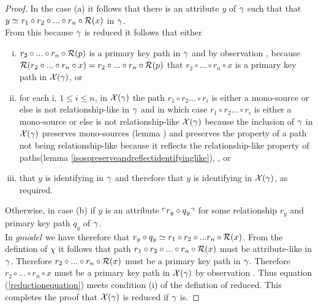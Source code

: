 \begin{proof}
In the case (a) it follows that there is an  attribute $y$ of $\gamma$ such that
that $y \simeq r_1 \circ r_2 \circ ... \circ r_n \circ \mathcal{R}(x)$ in $\gamma$. \\

From this because $\gamma$ is reduced it follows that either  
\begin{enumerate}[(i)]
\item $r_2 \circ ... \circ r_n \circ \mathcal{R}(p)$ is a primary key path in $\gamma$ and by observation , because $\mathcal{R}(r_2 \circ ... \circ r_n \circ x) = r_2 \circ ... \circ r_n \circ \mathcal{R}(p)$ that $r_2 \circ ... \circ r_n \circ x$ is a primary key path in $\mathcal{X}(\gamma)$, or 
\item for each i, $1 \leq i \leq n$, in $\mathcal{X}(\gamma)$ the path $r_1 \circ r_2 ... \circ r_i$ is either a mono-source or else is not relationship-like in $\gamma$
and in which case $r_1 \circ r_2 ... \circ r_i$ is either a mono-source or else is not relationship-like $\mathcal{X}(\gamma)$ because the inclusion of $\gamma$ in $\mathcal{X}(\gamma)$ 
preserves mono-sources (lemma ) and preserves the property of a path not being relationship-like because it reflects the relationship-like property of paths(lemma \ref{isospreserveandreflectidentifyinglike}), , or
\item that $y$ is identifying in $\gamma$ and therefore that $y$ is identifying in $\mathcal{X}(\gamma)$, as required.
\end{enumerate}

Otherwise, in case (b) if $y$ is an attribute $\left\ulcorner r_y \circ q_y\right\urcorner$ for some relationship $r_y$ and primary key path $q_y$ of $\gamma$. \\

In $gmodel$ we have therefore that $r_y \circ q_y \simeq r_1 \circ r_2 \circ ... r_n \circ \mathcal{R}(x)$. From the defintion of $\chi$ it follows that path
$r_1 \circ r_2 \circ ... \circ r_n \circ \mathcal{R}(x)$ must be attribute-like in $\gamma$. Therefore $r_2 \circ ... \circ r_n \circ \mathcal{R}(x)$ must be a primary
key path in $\gamma$. Therefore $r_2 \circ ... \circ r_n \circ x$ must be a primary key path in $\mathcal{X}(\gamma)$    by observation .
Thus equation (\ref{reductionequation}) meets condition (i) of the defintion of reduced. This completes the proof that $\mathcal{X}(\gamma)$ is reduced if $\gamma$ is.
\end{proof}

